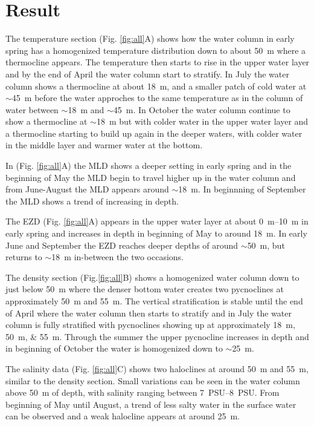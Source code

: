 \documentclass[../Main.tex]{subfiles}
\begin{document}
\section*{\crule[blue]{.3cm}{.3cm} Result}
The temperature section (Fig. \ref{fig:all}A) shows how the water column in early spring has a homogenized temperature distribution down to about \SI{50}{\metre} where a thermocline appears. The temperature then starts to rise in the upper water layer and by the end of April the water column start to stratify. In July the water column shows a thermocline at about \SI{18}{m}, and a smaller patch of cold water at $\sim$\SI{45}{\metre} before the water approches to the same temperature as in the column of water between $\sim$\SI{18}{\metre} and $\sim$\SI{45}{\metre}. 
In October the water column continue to show a thermocline at $\sim$\SI{18}{\metre} but with colder water in the upper water layer and a thermocline starting to build up again in the deeper waters, with colder water in the middle layer and warmer water at the bottom. 

In (Fig. \ref{fig:all}A) the MLD shows a deeper setting in early spring and in the beginning of May the MLD begin to travel higher up in the water column and from June-August the MLD appears around $\sim$\SI{18}{\metre}. In beginnning of September the MLD shows a trend of increasing in depth. 

The EZD (Fig. \ref{fig:all}A) appears in the upper water layer at about \SIrange{0}{10}{m} in early spring and increases in depth in beginning of May to around \SI{18}{m}. In early June and September the EZD reaches deeper depths of around $\sim$\SI{50}{\metre}, but returns to $\sim$\SI{18}{\metre} in-between the two occasions.

The density section (Fig.\ref{fig:all}B) shows a homogenized water column down to just below \SI{50}{m} where the denser bottom water creates two pycnoclines at approximately \SI{50}{m} and \SI{55}{m}. The vertical stratification is stable until the end of April where the water column then starts to stratify and in July the water column is fully stratified with pycnoclines showing up at approximately \SIlist{18;50;55}{\metre}. 
Through the summer the upper pycnocline increases in depth and in beginning of October the water is homogenized down to $\sim$\SI{25}{\metre}.

The salinity data (Fig. \ref{fig:all}C) shows two haloclines at around \SI{50}{m} and \SI{55}{m}, similar to the density section. Small variations can be seen in the water column above \SI{50}{m} of depth, with salinity ranging between \SIrange{7}{8}{PSU}. From beginning of May until August, a trend of less salty water in the surface water can be observed and a weak halocline appears at around \SI{25}{m}.
\end{document}
